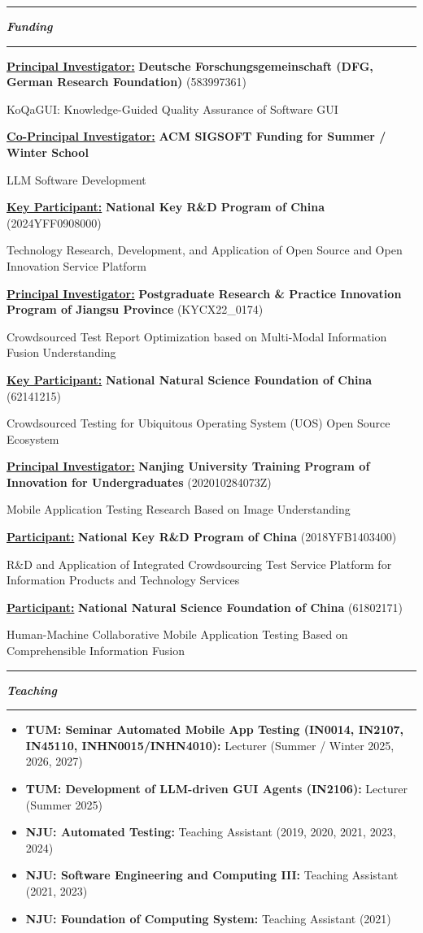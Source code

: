 \documentclass[12pt,a4paper]{article}
\newcommand{\cvsection}[1]{%
  \par\vspace{5pt}%
  \noindent\begin{minipage}{\linewidth}%
    \rule{\linewidth}{1.3pt}\par%
    \parbox[c][31pt][c]{\linewidth}{%
      \fontsize{20}{22}\selectfont\bfseries\itshape #1%
    }\par%
    \rule{\linewidth}{1.3pt}%
  \end{minipage}\par\nobreak\vspace{4pt}\nobreak%
}
\newcommand{\funding}[4]{%
  \textbf{\uline{#1:}} \textbf{#2}#3\par
  #4\par\vspace{5pt}%
}
\begin{document}
\cvsection{Funding}
\funding{Principal Investigator}{Deutsche Forschungsgemeinschaft (DFG, German Research Foundation)}{ (583997361)}{KoQaGUI: Knowledge-Guided Quality Assurance of Software GUI}
\funding{Co-Principal Investigator}{ACM SIGSOFT Funding for Summer / Winter School}{}{LLM Software Development}
\funding{Key Participant}{National Key R\&D Program of China}{ (2024YFF0908000)}{Technology Research, Development, and Application of Open Source and Open Innovation Service Platform}
\funding{Principal Investigator}{Postgraduate Research \& Practice Innovation Program of Jiangsu Province}{ (KYCX22\_0174)}{Crowdsourced Test Report Optimization based on Multi-Modal Information Fusion Understanding}
\funding{Key Participant}{National Natural Science Foundation of China}{ (62141215)}{Crowdsourced Testing for Ubiquitous Operating System (UOS) Open Source Ecosystem}
\funding{Principal Investigator}{Nanjing University Training Program of Innovation for Undergraduates}{ (202010284073Z)}{Mobile Application Testing Research Based on Image Understanding}
\funding{Participant}{National Key R\&D Program of China}{ (2018YFB1403400)}{R\&D and Application of Integrated Crowdsourcing Test Service Platform for Information Products and Technology Services}
\funding{Participant}{National Natural Science Foundation of China}{ (61802171)}{Human-Machine Collaborative Mobile Application Testing Based on Comprehensible Information Fusion}

\cvsection{Teaching}
\begin{itemize}[leftmargin=1.25em,label=\textbullet,topsep=0pt,itemsep=2pt,parsep=0pt]
  \item \textbf{TUM: Seminar Automated Mobile App Testing (IN0014, IN2107, IN45110, INHN0015/\allowbreak INHN4010):} Lecturer (Summer / Winter 2025, 2026, 2027)
  \item \textbf{TUM: Development of LLM-driven GUI Agents (IN2106):} Lecturer (Summer 2025)
  \item \textbf{NJU: Automated Testing:} Teaching Assistant (2019, 2020, 2021, 2023, 2024)
  \item \textbf{NJU: Software Engineering and Computing III:} Teaching Assistant (2021, 2023)
  \item \textbf{NJU: Foundation of Computing System:} Teaching Assistant (2021)
\end{itemize}
\end{document}
